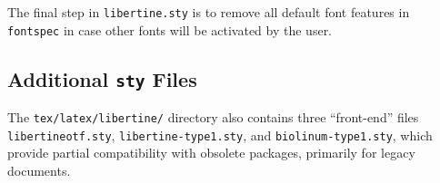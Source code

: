\documentclass[11pt]{article}
\begin{document}
The final step in \verb|libertine.sty| is to remove all default font features
in \texttt{fontspec} in case other fonts will be activated by the user.

\subsection{Additional \texttt{sty} Files}
The \verb|tex/latex/libertine/| directory also contains three ``front-end'' files
\verb|libertineotf.sty|, \verb|libertine-type1.sty|, and \verb|biolinum-type1.sty|,
which provide partial compatibility with obsolete packages, primarily for legacy
documents.  
\end{document}

